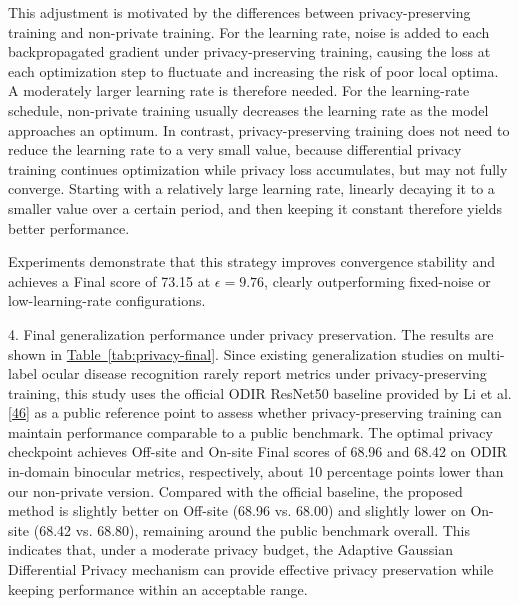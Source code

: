 This adjustment is motivated by the differences between privacy-preserving training and non-private training. For the learning rate, noise is added to each backpropagated gradient under privacy-preserving training, causing the loss at each optimization step to fluctuate and increasing the risk of poor local optima. A moderately larger learning rate is therefore needed. For the learning-rate schedule, non-private training usually decreases the learning rate as the model approaches an optimum. In contrast, privacy-preserving training does not need to reduce the learning rate to a very small value, because differential privacy training continues optimization while privacy loss accumulates, but may not fully converge. Starting with a relatively large learning rate, linearly decaying it to a smaller value over a certain period, and then keeping it constant therefore yields better performance.

Experiments demonstrate that this strategy improves convergence stability and achieves a Final score of 73.15 at \(\epsilon = 9.76\), clearly outperforming fixed-noise or low-learning-rate configurations.

4. Final generalization performance under privacy preservation. The results are shown in \hyperref[tab:privacy-final]{Table~\ref*{tab:privacy-final}}. Since existing generalization studies on multi-label ocular disease recognition rarely report metrics under privacy-preserving training, this study uses the official ODIR ResNet50 baseline provided by Li et al. \hyperref[_Ref213949402]{{[}46{]}} as a public reference point to assess whether privacy-preserving training can maintain performance comparable to a public benchmark. The optimal privacy checkpoint achieves Off-site and On-site Final scores of 68.96 and 68.42 on ODIR in-domain binocular metrics, respectively, about 10 percentage points lower than our non-private version. Compared with the official baseline, the proposed method is slightly better on Off-site (68.96 vs. 68.00) and slightly lower on On-site (68.42 vs. 68.80), remaining around the public benchmark overall. This indicates that, under a moderate privacy budget, the Adaptive Gaussian Differential Privacy mechanism can provide effective privacy preservation while keeping performance within an acceptable range.

